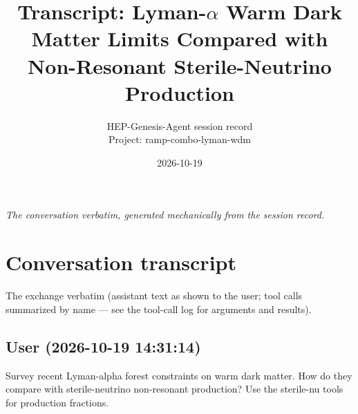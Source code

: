 \documentclass[11pt,a4paper]{article}
\title{Transcript: Lyman-$\alpha$ Warm Dark Matter Limits Compared with Non-Resonant Sterile-Neutrino Production}
\author{HEP-Genesis-Agent session record \\ \small Project: ramp-combo-lyman-wdm}
\date{2026-10-19}
\begin{document}
\maketitle
\noindent\textit{\small The conversation verbatim, generated mechanically from the session record.}
\vspace{1em}



\appendix
\section{Conversation transcript}
\label{app:transcript}
The exchange verbatim (assistant text as shown to the user; tool calls summarized by name --- see the tool-call log for arguments and results).
\subsection*{User \small(2026-10-19 14:31:14)}
Survey recent Lyman-alpha forest constraints on warm dark matter. How do they compare with sterile-neutrino non-resonant production? Use the sterile-nu tools for production fractions.
\end{document}
